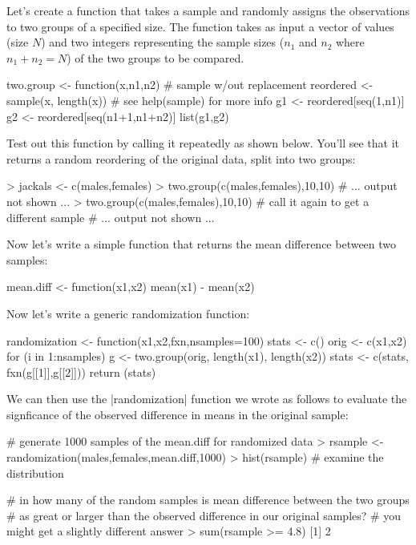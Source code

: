 Let's create a function that takes a sample and randomly assigns the observations to two groups of a specified size. The function takes as input a vector of values (size $N$) and two integers representing the sample sizes ($n_1$ and $n_2$ where $n_1 + n_2 = N$) of the two groups to be compared.

\begin{R}
two.group <- function(x,n1,n2){
  # sample w/out replacement
  reordered <- sample(x, length(x)) # see help(sample) for more info
  g1 <- reordered[seq(1,n1)]
  g2 <- reordered[seq(n1+1,n1+n2)]
  list(g1,g2)
}    
\end{R}

Test out this function by calling it repeatedly as shown below. You'll see that it returns a random reordering of the original data, split into two groups:

\begin{R}
> jackals <- c(males,females)    
> two.group(c(males,females),10,10)
# ... output not shown ...
> two.group(c(males,females),10,10) # call it again to get a different sample
# ... output not shown ...
\end{R}

Now let's write a simple function that returns the mean difference between two samples:

\begin{R}
mean.diff <- function(x1,x2) {
  mean(x1) - mean(x2)
}    
\end{R}

Now let's write a generic randomization function:

\begin{R}
randomization <- function(x1,x2,fxn,nsamples=100){
  stats <- c()
  orig <- c(x1,x2)
  for (i in 1:nsamples){
    g <- two.group(orig, length(x1), length(x2))
    stats <- c(stats, fxn(g[[1]],g[[2]]))
  }
  return (stats)
}
\end{R}

We can then use the |randomization| function we wrote as follows to evaluate the signficance of the observed difference in means in the original sample:

\begin{R}
# generate 1000  samples of the mean.diff for randomized data    
> rsample <- randomization(males,females,mean.diff,1000)    
> hist(rsample)  # examine the distribution

# in how many of the random samples is mean difference between the two groups
# as great or larger than the observed difference in our original samples?
# you might get a slightly different answer
> sum(rsample >= 4.8)
[1] 2  
\end{R}    

